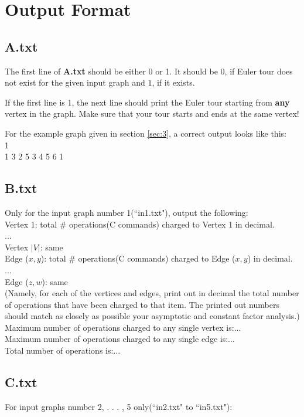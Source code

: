 \documentclass{article}
\begin{document}
\section{Output Format}\label{sec}
\subsection*{\textbf{A.txt}}
The first line of \textbf{A.txt} should be either 0 or 1. It should be $0$, if Euler tour does not exist for the given input graph and $1$, if it exists.

If the first line is 1, the next line should print the Euler tour starting from \textbf{any} vertex in the graph. Make sure that your tour starts and ends at the same vertex!

For the example graph given in section \ref{sec:3}, a correct output looks like this:\\
1\\
1 3 2 5 3 4 5 6 1

\subsection*{\textbf{B.txt}}
Only for the input graph number 1(``in1.txt"), output the following:\\
Vertex 1: total \# operations(C commands) charged to Vertex 1 in decimal.\\
...\\
Vertex $|V|$: same\\
Edge ($x, y$): total \# operations(C commands) charged to Edge ($x, y$) in decimal.\\
...\\
Edge ($z, w$): same\\
(Namely, for each of the vertices and edges, print out in decimal the total number of operations that have been charged to that item. The printed out numbers should match as closely as possible your asymptotic and constant factor analysis.)\\
Maximum number of operations charged to any single vertex is:...\\
Maximum number of operations charged to any single edge is:...\\
Total number of operations is:...

\subsection*{\textbf{C.txt}}
For input graphs number 2, . . . , 5 only(``in2.txt" to ``in5.txt"):\\
\end{document}
